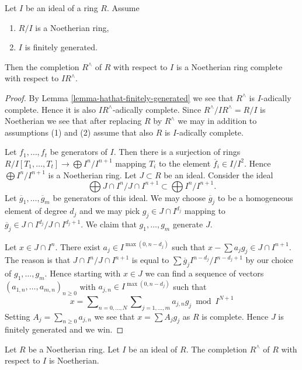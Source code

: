 \begin{lemma}
\label{lemma-completion-Noetherian}
Let $I$ be an ideal of a ring $R$. Assume
\begin{enumerate}
\item $R/I$ is a Noetherian ring,
\item $I$ is finitely generated.
\end{enumerate}
Then the completion $R^\wedge$ of $R$ with respect to $I$
is a Noetherian ring complete with respect to $IR^\wedge$.
\end{lemma}

\begin{proof}
By
Lemma \ref{lemma-hathat-finitely-generated}
we see that $R^\wedge$ is $I$-adically complete. Hence it is also
$IR^\wedge$-adically complete. Since $R^\wedge/IR^\wedge = R/I$ is
Noetherian we see that after replacing $R$ by $R^\wedge$ we may in
addition to assumptions (1) and (2) assume that also $R$ is $I$-adically
complete.

\medskip\noindent
Let $f_1, \ldots, f_t$ be generators of $I$.
Then there is a surjection of rings
$R/I[T_1, \ldots, T_t] \to \bigoplus I^n/I^{n + 1}$
mapping $T_i$ to the element $\overline{f}_i \in I/I^2$.
Hence $\bigoplus I^n/I^{n + 1}$ is a Noetherian ring.
Let $J \subset R$ be an ideal. Consider the ideal
$$
\bigoplus J \cap I^n/J \cap I^{n + 1} \subset \bigoplus I^n/I^{n + 1}.
$$
Let $\overline{g}_1, \ldots, \overline{g}_m$ be generators of this
ideal. We may choose $\overline{g}_j$ to be a homogeneous element
of degree $d_j$ and we may pick $g_j \in J \cap I^{d_j}$ mapping to
$\overline{g}_j \in J \cap I^{d_j}/J \cap I^{d_j + 1}$. We claim
that $g_1, \ldots, g_m$ generate $J$.

\medskip\noindent
Let $x \in J \cap I^n$. There exist $a_j \in I^{\max(0, n - d_j)}$ such that
$x - \sum a_j g_j \in J \cap I^{n + 1}$.
The reason is that $J \cap I^n/J \cap I^{n + 1}$ is equal to
$\sum \overline{g}_j I^{n - d_j}/I^{n - d_j + 1}$ by our choice
of $g_1, \ldots, g_m$. Hence starting with $x \in J$ we can find
a sequence of vectors $(a_{1, n}, \ldots, a_{m, n})_{n \geq 0}$
with $a_{j, n} \in I^{\max(0, n - d_j)}$ such that
$$
x =
\sum\nolimits_{n = 0, \ldots, N}
\sum\nolimits_{j = 1, \ldots, m} a_{j, n} g_j \bmod I^{N + 1}
$$
Setting $A_j = \sum_{n \geq 0} a_{j, n}$ we see that
$x = \sum A_j g_j$ as $R$ is complete. Hence $J$ is finitely generated and
we win.
\end{proof}

\begin{lemma}
\label{lemma-completion-Noetherian-Noetherian}
Let $R$ be a Noetherian ring.
Let $I$ be an ideal of $R$.
The completion $R^\wedge$ of $R$ with respect to $I$ is
Noetherian.
\end{lemma}

